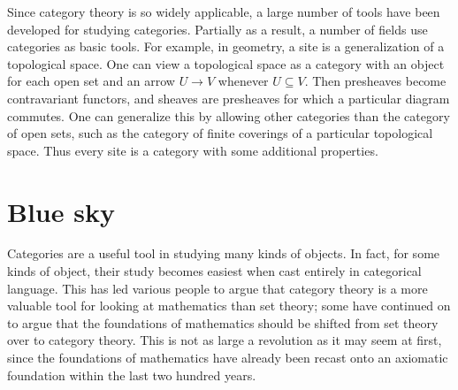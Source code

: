 \documentclass[12pt]{article}
\begin{document}
Since category theory is so widely applicable, a large number of tools have been developed for studying categories.  Partially as a result, a number of fields use categories as basic tools.  For example, in geometry, a site is a generalization of a topological space.  One can view a topological space as a category with an object for each open set and an arrow $U\to V$ whenever $U\subseteq V$.  Then presheaves become contravariant functors, and sheaves are presheaves for which a particular diagram commutes.  One can generalize this by allowing other categories than the category of open sets, such as the category of finite coverings of a particular topological space.  Thus every site is a category with some additional properties. 

\section*{Blue sky}

Categories are a useful tool in studying many kinds of objects.  In fact, for some kinds of object, their study becomes easiest when cast entirely in categorical language.  This has led various people to argue that category theory is a more valuable tool for looking at mathematics than set theory; some have continued on to argue that the foundations of mathematics should be shifted from set theory over to category theory.  This is not as large a revolution as it may seem at first, since the foundations of mathematics have already been recast onto an axiomatic foundation within the last two hundred years.

\end{document}
